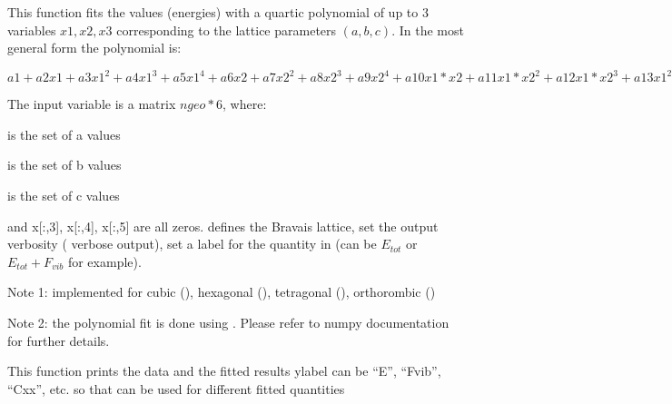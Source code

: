 \documentclass[letterpaper,10pt,english]{sphinxmanual}
\begin{document}
\begin{fulllineitems}
\label{pyqha:pyqha.fitutils.fit_quartic}
This function fits the  values (energies) with a quartic polynomial of
up to 3 variables \(x1,x2,x3\) corresponding to the lattice parameters
\((a,b,c)\). In the most general form the polynomial is:

\(a1 + a2 x1 + a3 x1^2 + a4  x1^3 + a5  x1^4 + a6 x2 + a7  x2^2 + 
a8  x2^3 + a9  x2^4 + a10 x1*x2 + a11 x1*x2^2 + a12 x1*x2^3 +
a13 x1^2*x2 + a14 x1^2*x2^2 + a15 x1^3*x2 + a16 x3 + a17 x3^2 + a18 x3^3 +
a19 x3^4 + a20 x1*x3 + a21 x1*x3^2 + a22 x1*x3^3 + a23 x1^2*x3 + a24 x1^2*x3^2 +
a25 x1^3*x3 + a26 x2*x3 + a27 x2*x3^2 + a28 x2*x3^3 + a29 x2^2*x3 +
a30 x2^2*x3^2 + a31 x2^3*x3 + a32 x1*x2*x3 + a33 x1^2*x2*x3 +
a34 x1*x2^2*x3 + a35 x1*x2*x3^2\)

The input variable  is a matrix \(ngeo*6\), where:

 is the set of a values

 is the set of b values

 is the set of c values

and x{[}:,3{]}, x{[}:,4{]}, x{[}:,5{]} are all zeros. 
 defines the Bravais lattice,  set the output verbosity ( 
verbose output),  set a label for the quantity in  (can be \(E_{tot}\)
or \(E_{tot}+F_{vib}\) for example).

Note 1: implemented for cubic (), hexagonal (), 
tetragonal (), orthorombic ()

Note 2: the polynomial fit is done using . 
Please refer to numpy documentation for further details.

\end{fulllineitems}


\begin{fulllineitems}
\label{pyqha:pyqha.fitutils.print_data}
This function prints the data and the fitted results 
ylabel can be ``E'', ``Fvib'', ``Cxx'', etc. so that can be used for different
fitted quantities

\end{fulllineitems}
\end{document}
